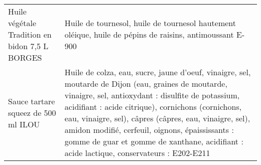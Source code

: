 \begin{longtable}{p{5cm}p{10cm}}
                                                           Huile végétale Tradition en bidon 7,5 L BORGES &                                                                                                                                                                                                                                                                                                                                                                                                                                                                                                                                                                                                                                                                                                                                                                                                                                                                                                                                 Huile de tournesol, huile de tournesol hautement oléique, huile de pépins de raisins, antimoussant E-900 \\
                                                                      Sauce tartare squeez de 500 ml ILOU &                                                                                                                                                                                                                                                                                                                                                                                                                                                                                                                                                                                                                 Huile de colza, eau, sucre, jaune d'oeuf, vinaigre, sel, moutarde de Dijon (eau, graines de moutarde, vinaigre, sel, antioxydant : disulfite de potassium, acidifiant : acide citrique), cornichons (cornichons, eau, vinaigre, sel), câpres (câpres, eau, vinaigre, sel), amidon modifié, cerfeuil, oignons, épaississants : gomme de guar et gomme de xanthane, acidifiant : acide lactique, conservateurs : E202-E211 \\

\end{longtable}
